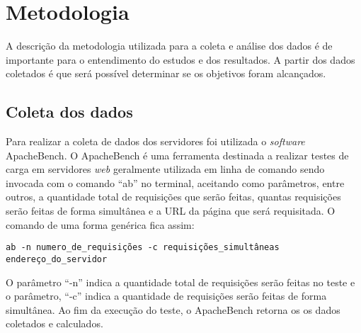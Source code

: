 \chapter{Metodologia}\label{cap:metodologia}
A descrição da metodologia utilizada para a coleta e análise dos dados é de 
importante para o entendimento do estudos e dos resultados. A partir dos dados 
coletados é que será possível determinar se os objetivos foram alcançados.\\

\section{Coleta dos dados}
Para realizar a coleta de dados dos servidores foi utilizada o 
\textit{software} ApacheBench. O ApacheBench é uma ferramenta destinada a 
realizar testes de carga em servidores \textit{web} geralmente utilizada em 
linha de comando sendo invocada com o comando ``ab'' no terminal, aceitando 
como parâmetros, entre outros, a quantidade total de requisições que serão 
feitas, quantas requisições serão feitas de forma simultânea e a URL da página 
que será requisitada. O comando de uma forma genérica fica assim:
\begin{verbatim}
ab -n numero_de_requisições -c requisições_simultâneas endereço_do_servidor
\end{verbatim}
O parâmetro ``-n'' indica a quantidade total de requisições serão feitas no 
teste e o parâmetro, ``-c'' indica a quantidade de requisições serão feitas de 
forma simultânea. Ao fim da execução do teste, o ApacheBench retorna os os 
dados coletados e calculados.



